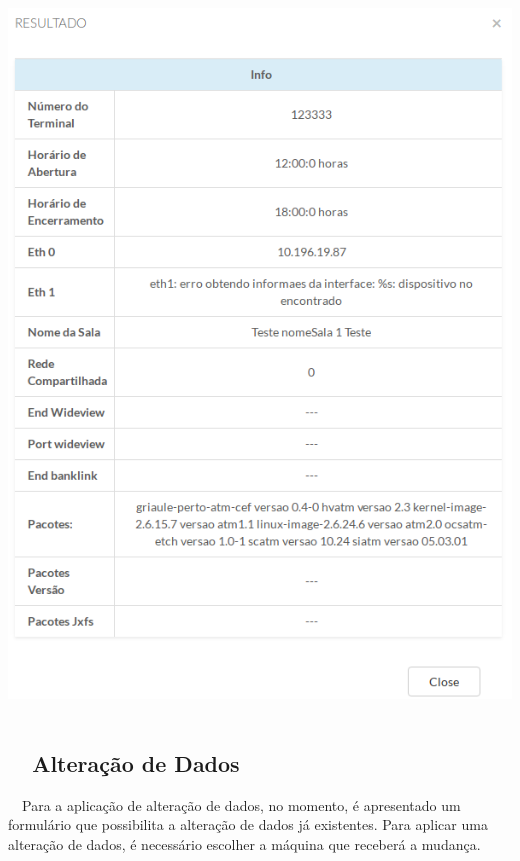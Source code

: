     \begin{center}
    \includegraphics[width=13.936cm,height=19.131cm]{figuras/RATCETECATMSTFLS051718v2-img004.png}
    \end{center}

    \bigskip


    \bigskip

    \subsection[\ \ Altera\c{c}\~ao de Dados]{\ \ Altera\c{c}\~ao de Dados}
{\color{black}
    \ \ Para a aplica\c{c}\~ao de altera\c{c}\~ao de dados, no momento, \'e apresentado um formul\'ario que possibilita a
        altera\c{c}\~ao de dados j\'a existentes. Para aplicar uma altera\c{c}\~ao de dados, \'e necess\'ario escolher a
        m\'aquina que receber\'a a mudan\c{c}a.}

